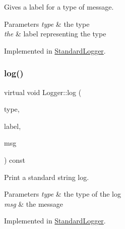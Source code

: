 Gives a label for a type of message. 


\begin{DoxyParams}{Parameters}
{\em type} & the type \\
\hline
{\em the} & label representing the type \\
\hline
\end{DoxyParams}


Implemented in \mbox{\hyperlink{class_standard_logger_a5803969715008363869dfd47326790bb}{Standard\+Logger}}.

\mbox{\label{class_logger_a124934c1b2661b229aca0493f7ec5f30}} 
\subsubsection{\texorpdfstring{log()}{log()}\hspace{0.1cm}{\footnotesize\ttfamily [1/2]}}
{\footnotesize\ttfamily virtual void Logger\+::log (\begin{DoxyParamCaption}\item[{const \mbox{\hyperlink{class_logger_acd39cb578d7a6750c959f2fad38d8db6}{Logger\+::\+Type}} \&}]{type,  }\item[{const std\+::string \&}]{label,  }\item[{const std\+::string \&}]{msg }\end{DoxyParamCaption}) const\hspace{0.3cm}{\ttfamily [pure virtual]}}



Print a standard string log. 


\begin{DoxyParams}{Parameters}
{\em type} & the type of the log \\
\hline
{\em msg} & the message \\
\hline
\end{DoxyParams}


Implemented in \mbox{\hyperlink{class_standard_logger_a11c29fca1b05d7ff331b298e9c91cd81}{Standard\+Logger}}.

\mbox{\label{class_logger_a9bdd18a8fb9cd19134b9ddf37f74b5bd}} 
